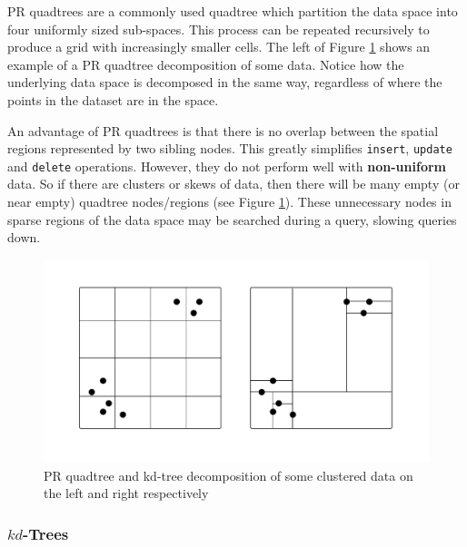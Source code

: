 PR quadtrees are a commonly used quadtree which partition the data space into four uniformly sized sub-spaces. This process can be repeated recursively to produce a grid with increasingly smaller cells. The left of Figure \ref{fig:quadtree-kdtree-clustered} shows an example of a PR quadtree decomposition of some data. Notice how the underlying data space is decomposed in the same way, regardless of where the points in the dataset are in the space.

An advantage of PR quadtrees is that there is no overlap between the spatial regions represented by two sibling nodes. This greatly simplifies \texttt{insert}, \texttt{update} and \texttt{delete} operations. However, they do not perform well with \textbf{non-uniform} data. So if there are clusters or skews of data, then there will be many empty (or near empty) quadtree nodes/regions (see Figure \ref{fig:quadtree-kdtree-clustered}). These unnecessary nodes in sparse regions of the data space may be searched during a query, slowing queries down.

\begin{figure}
	\vspace{-40pt}
	\begin{center}
		\includegraphics[scale=0.35]{figures/quadtrees_kdtrees_clustered.pdf}
	\end{center}
	\vspace{-30pt}
	\caption{PR quadtree and kd-tree decomposition of some clustered data on the left and right respectively}
	\label{fig:quadtree-kdtree-clustered}
\end{figure}

\subsubsection{$kd$-Trees}

